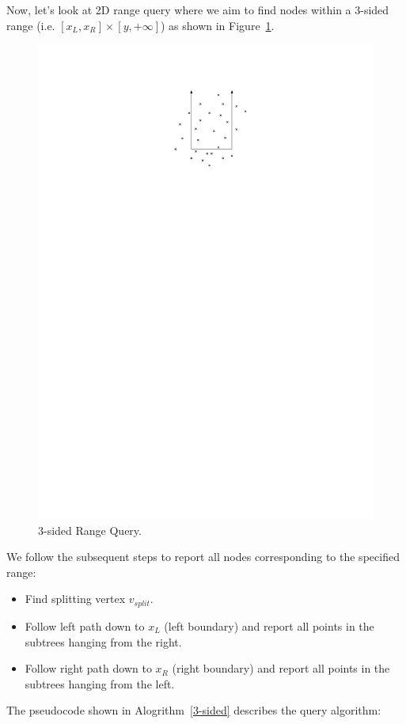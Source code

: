 Now, let's look at 2D range query where we aim to find nodes within a 3-sided range (i.e. $[x_L, x_R] \times [y, +\infty]$) as shown in Figure~\ref{fig:PST2}.
\begin{figure}[h!]
\begin{center}
  \includegraphics[scale = 1]{ipe/RQ2.pdf}
  \vspace{-0.1in}
  \caption{3-sided Range Query.}
  \label{fig:PST2}
\end{center}
\end{figure}


We follow the subsequent steps to report all nodes corresponding to the specified range:
\begin{itemize}
    \item Find splitting vertex $v_{split}$.
    \item Follow left path down to $x_L$ (left boundary) and report all points in the subtrees hanging from the right.
    \item Follow right path down to $x_R$ (right boundary) and report all points in the subtrees hanging from the left.
\end{itemize}
The pseudocode shown in Alogrithm~\ref{3-sided} describes the query algorithm:

